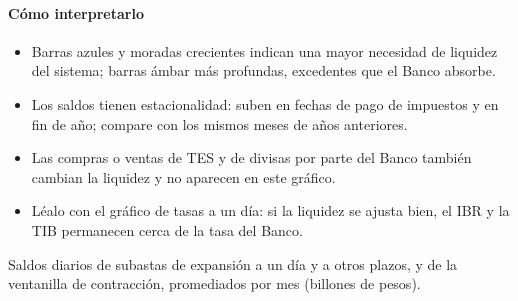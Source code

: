\paragraph{Cómo interpretarlo}
\begin{itemize}
\item Barras azules y moradas crecientes indican una mayor necesidad de liquidez del sistema; barras ámbar más profundas, excedentes que el Banco absorbe.
\item Los saldos tienen estacionalidad: suben en fechas de pago de impuestos y en fin de año; compare con los mismos meses de años anteriores.
\item Las compras o ventas de TES y de divisas por parte del Banco también cambian la liquidez y no aparecen en este gráfico.
\item Léalo con el gráfico de tasas a un día: si la liquidez se ajusta bien, el IBR y la TIB permanecen cerca de la tasa del Banco.
\end{itemize}
\begin{formulas}[Fórmulas]
\end{formulas}
\begin{metodo}[Metodología]
Saldos diarios de subastas de expansión a un día y a otros plazos, y de la ventanilla de contracción, promediados por mes (billones de pesos).
\par{}
\end{metodo}


